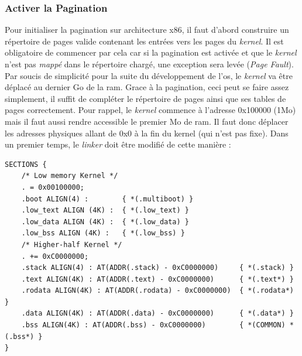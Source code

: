 
\subsubsection{Activer la Pagination}
Pour initialiser la pagination sur architecture x86, il faut d'abord construire
un répertoire de pages valide contenant les entrées vers les pages du \textit{kernel}.
Il est obligatoire de commencer par cela car si la pagination est activée et que
le \textit{kernel} n'est pas \textit{mappé} dans le répertoire chargé, une exception
sera levée (\textit{Page Fault}). Par soucis de simplicité pour la suite du développement
de l'\acrshort{os}, le \textit{kernel} va être déplacé au dernier Go de la \acrshort{ram}.
Grace à la pagination, ceci peut se faire assez simplement, il suffit de compléter
le répertoire de pages ainsi que ses tables de pages correctement. Pour rappel,
le \textit{kernel} commence à l'adresse 0x100000 (1Mo) mais il faut aussi rendre
accessible le premier Mo de \acrshort{ram}. Il faut donc déplacer les adresses physiques
allant de 0x0 à la fin du kernel (qui n'est pas fixe). Dans un premier temps, le
\textit{linker} doit être modifié de cette manière :

\begin{verbatim}
SECTIONS {
    /* Low memory Kernel */
    . = 0x00100000;
    .boot ALIGN(4) :        { *(.multiboot) }
    .low_text ALIGN (4K) :  { *(.low_text) }
    .low_data ALIGN (4K) :  { *(.low_data) }
    .low_bss ALIGN (4K) :   { *(.low_bss) }
    /* Higher-half Kernel */
    . += 0xC0000000;
    .stack ALIGN(4) : AT(ADDR(.stack) - 0xC0000000)     { *(.stack) }
    .text ALIGN(4K) : AT(ADDR(.text) - 0xC0000000)      { *(.text*) }
    .rodata ALIGN(4K) : AT(ADDR(.rodata) - 0xC0000000)  { *(.rodata*) }
    .data ALIGN(4K) : AT(ADDR(.data) - 0xC0000000)      { *(.data*) }
    .bss ALIGN(4K) : AT(ADDR(.bss) - 0xC0000000)        { *(COMMON) *(.bss*) }
}
\end{verbatim}

